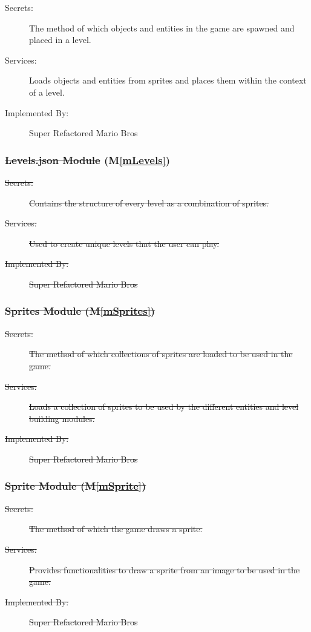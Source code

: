 \documentclass[12pt, titlepage]{article}
\newcommand{\mref}[1]{M\ref{#1}}
\begin{document}
\begin{description}
\item[Secrets:] The method of which objects and entities in the game are spawned and placed in a level.
\item[Services:] Loads objects and entities from sprites and places them within the context of a level.
\item[Implemented By:] Super Refactored Mario Bros
\end{description}

\subsubsection{\sout{Levels.json Module} (\mref{mLevels})}

\begin{description}
\item[\sout{Secrets:}] \sout{Contains the structure of every level as a combination of sprites.}
\item[\sout{Services:}] \sout{Used to create unique levels that the user can play.}
\item[\sout{Implemented By:}] \sout{Super Refactored Mario Bros}
\end{description}

\subsubsection{\sout{Sprites Module (\mref{mSprites})}}

\begin{description}
\item[\sout{Secrets:}] \sout{The method of which collections of sprites are loaded to be used in the game.}
\item[\sout{Services:}] \sout{Loads a collection of sprites to be used by the different entities and level building modules.}
\item[\sout{Implemented By:}] \sout{Super Refactored Mario Bros}
\end{description}

\subsubsection{\sout{Sprite Module (\mref{mSprite})}}

\begin{description}
\item[\sout{Secrets:}] \sout{The method of which the game draws a sprite.}
\item[\sout{Services:}] \sout{Provides functionalities to draw a sprite from an image to be used in the game.}
\item[\sout{Implemented By:}] \sout{Super Refactored Mario Bros}
\end{description}
\end{document}
